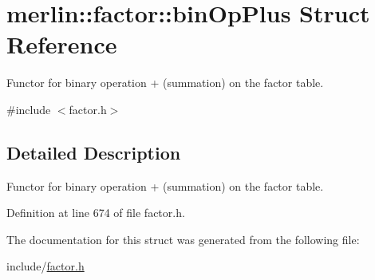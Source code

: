 \hypertarget{structmerlin_1_1factor_1_1binOpPlus}{}\section{merlin\+:\+:factor\+:\+:bin\+Op\+Plus Struct Reference}
\label{structmerlin_1_1factor_1_1binOpPlus}


Functor for binary operation + (summation) on the factor table.  




{\ttfamily \#include $<$factor.\+h$>$}



\subsection{Detailed Description}
Functor for binary operation + (summation) on the factor table. 

Definition at line 674 of file factor.\+h.



The documentation for this struct was generated from the following file\+:\begin{DoxyCompactItemize}
\item 
include/\hyperlink{factor_8h}{factor.\+h}\end{DoxyCompactItemize}
